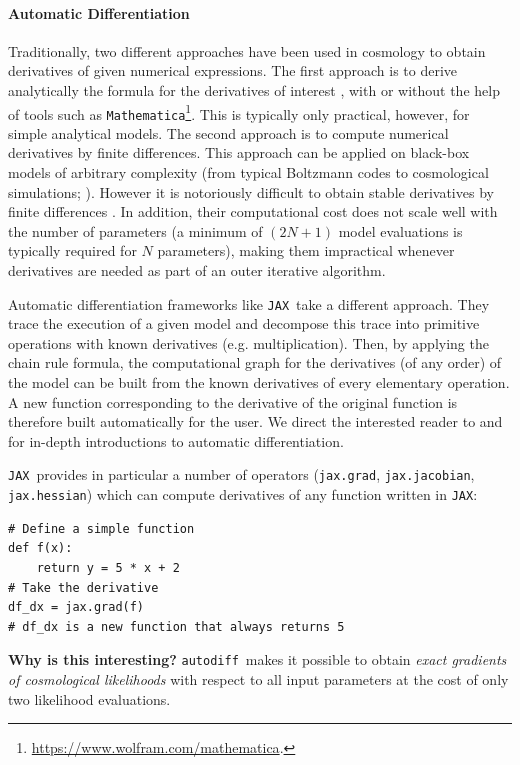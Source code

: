 \documentclass[twocolumn,twocolappendix,nofootinbib,iop]{openjournal}
\newcommand{\autodiff}{\texttt{autodiff}}
\newcommand{\jax}{\texttt{JAX}}
\begin{document}
\paragraph{\textbf{Automatic Differentiation}} Traditionally, two different approaches have been used in cosmology to obtain derivatives of given numerical expressions. The first approach is to derive analytically the formula for the derivatives of interest \citep[e.g.][]{2013MNRAS.432..894J, kostic}, with or without the help of tools such as \texttt{Mathematica}\footnote{\url{https://www.wolfram.com/mathematica}.}. This is typically only practical, however, for simple analytical models.
The second approach is to compute numerical derivatives by finite differences. This approach can be applied on black-box models of arbitrary complexity (from typical Boltzmann codes to cosmological simulations; \citealp{2020ApJS..250....2V}). However it is notoriously difficult to obtain stable derivatives by finite differences \citep[e.g.][]{2021arXiv210100298B, 2021A&A...649A..52Y}. In addition, their computational cost does not scale well with the number of parameters (a minimum of $(2N+1)$ model evaluations is typically required for $N$ parameters), making them impractical whenever derivatives are needed as part of an outer iterative algorithm.

Automatic differentiation frameworks like \jax\ take a different approach. They trace the execution of a given model and decompose this trace into primitive operations with known derivatives (e.g. multiplication). Then, by applying the chain rule formula, the computational graph for the derivatives (of any order) of the model can be built from the known derivatives of every elementary operation. A new function corresponding to the derivative of the original function is therefore built automatically for the user. We direct the interested reader to \citet{baydin2018automatic} and \citet{Margossian2019} for in-depth introductions to automatic differentiation. 

\jax\ provides in particular a number of operators (\texttt{jax.grad}, \texttt{jax.jacobian}, \texttt{jax.hessian}) which can compute derivatives of any function written in \jax:
\begin{lstlisting}[language=iPython]
# Define a simple function 
def f(x):
	return y = 5 * x + 2
# Take the derivative
df_dx = jax.grad(f)
# df_dx is a new function that always returns 5 
\end{lstlisting}

\textbf{Why is this interesting?} \autodiff\ makes it possible to obtain \textit{exact gradients of cosmological likelihoods} with respect to all input parameters at the cost of only two likelihood evaluations.
\end{document}
